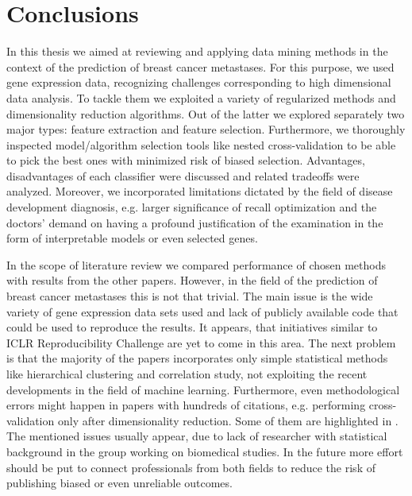 \documentclass[shortabstract, english, mgr]{iithesis}
\begin{document}
\chapter{Conclusions} \label{section:summary}

In this thesis we aimed at reviewing and applying data mining methods in the context of the prediction of breast cancer metastases. For this purpose, we used gene expression data, recognizing challenges corresponding to high dimensional data analysis. To tackle them we exploited a variety of regularized methods and dimensionality reduction algorithms. Out of the latter we explored separately two major types: feature extraction and feature selection. Furthermore, we thoroughly inspected model/algorithm selection tools like nested cross-validation to be able to pick the best ones with minimized risk of biased selection. Advantages, disadvantages of each classifier were discussed and related tradeoffs were analyzed. Moreover, we incorporated limitations dictated by the field of disease development diagnosis, e.g. larger significance of recall optimization and the doctors' demand on having a profound justification of the examination in the form of interpretable models or even selected genes. 

In the scope of literature review we compared performance of chosen methods with results from the other papers. However, in the field of the prediction of breast cancer metastases this is not that trivial. The main issue is the wide variety of gene expression data sets used and lack of publicly available code that could be used to reproduce the results. It appears, that initiatives similar to ICLR Reproducibility Challenge are yet to come in this area. The next problem is that the majority of the papers incorporates only simple statistical methods like hierarchical clustering and correlation study, not exploiting the recent developments in the field of machine learning. Furthermore, even methodological errors might happen in papers with hundreds of citations, e.g. performing cross-validation only after dimensionality reduction. Some of them are highlighted in \cite{dimRedInCV}. The mentioned issues usually appear, due to lack of researcher with statistical background in the group working on biomedical studies. In the future more effort should be put to connect professionals from both fields to reduce the risk of publishing biased or even unreliable outcomes. 
\end{document}

